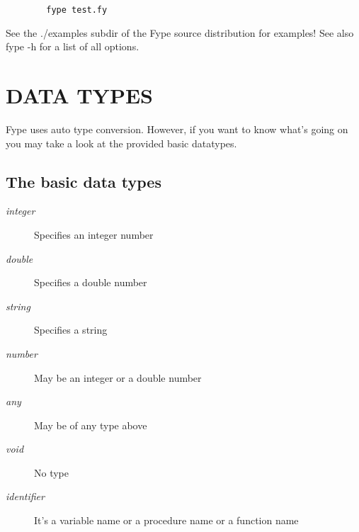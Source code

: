 \begin{verbatim}
        fype test.fy
\end{verbatim}


See the ./examples subdir of the Fype source distribution for examples! See also fype -h for a list of all options.

\section{DATA TYPES\label{DATA_TYPES}}


Fype uses auto type conversion. However, if you want to know what's going on you may take a look at the provided basic datatypes.

\subsection*{The basic data types\label{The_basic_data_types}}
\begin{description}

\item[{\textit{integer}}] \mbox{}

Specifies an integer number


\item[{\textit{double}}] \mbox{}

Specifies a double number


\item[{\textit{string}}] \mbox{}

Specifies a string


\item[{\textit{number}}] \mbox{}

May be an integer or a double number


\item[{\textit{any}}] \mbox{}

May be of any type above


\item[{\textit{void}}] \mbox{}

No type


\item[{\textit{identifier}}] \mbox{}

It's a variable name or a procedure name or a function name

\end{description}
